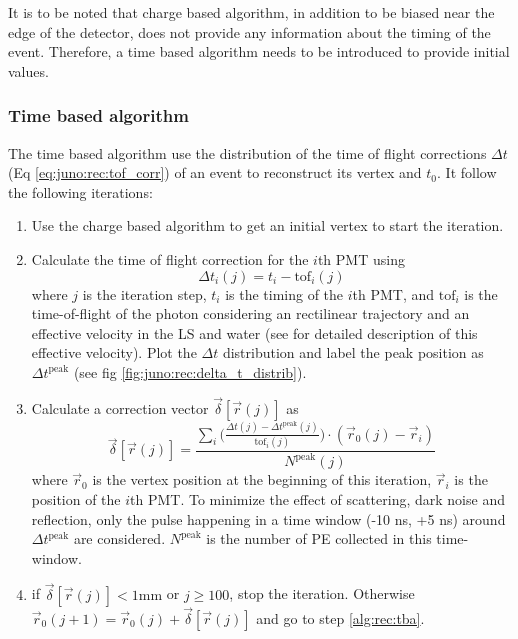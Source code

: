 \documentclass[../main.tex]{subfiles}
\begin{document}
It is to be noted that charge based algorithm, in addition to be biased near the edge of the detector, does not provide any information about the timing of the event. Therefore, a time based algorithm needs to be introduced to provide initial values.

\subsubsection{Time based algorithm}

The time based algorithm use the distribution of the time of flight corrections $\Delta t$ (Eq \ref{eq:juno:rec:tof_corr}) of an event to reconstruct its vertex and $t_0$. It follow the following iterations:

\begin{enumerate}
  \item Use the charge based algorithm to get an initial vertex to start the iteration.

  \item \label{alg:rec:tba} Calculate the time of flight correction for the $i$th PMT using \begin{equation}
      \label{eq:juno:rec:tof_corr}
      \Delta t_i (j) = t_i - \mathrm{tof}_i (j)
    \end{equation}
    where $j$ is the iteration step, $t_i$ is the timing of the $i$th PMT, and $\mathrm{tof}_i$ is the time-of-flight of the photon considering an rectilinear trajectory and an effective velocity in the LS and water (see \cite{li_event_2021} for detailed description of this effective velocity). Plot the $\Delta t$ distribution and label the peak position as $\Delta t^{\mathrm{peak}}$ (see fig \ref{fig:juno:rec:delta_t_distrib}).

  \item Calculate a correction vector $\vec{\delta} [\vec{r}(j)]$ as \begin{equation}
      \vec{\delta} [\vec{r}(j)] = \frac{\sum_i \bigg(\frac{\Delta t(j) - \Delta t^{\mathrm{peak}}(j)}{\mathrm{tof}_i(j)} \bigg) \cdot (\vec{r}_0(j) - \vec{r}_i)}{N^{\mathrm{peak}}(j)}
    \end{equation}
    where $\vec{r}_0$ is the vertex position at the beginning of this iteration, $\vec{r}_i$ is the position of the $i$th PMT. To minimize the effect of scattering, dark noise and reflection, only the pulse happening in a time window (-10 ns, +5 ns) around $\Delta t^{\mathrm{peak}}$ are considered. $N^{\mathrm{peak}}$ is the number of PE collected in this time-window.

  \item if $\vec{\delta} [\vec{r}(j)] < 1 \mathrm{mm}$ or $j \geq 100$, stop the iteration. Otherwise $\vec{r}_0 (j + 1) = \vec{r}_0 (j) + \vec{\delta} [\vec{r}(j)]$ and go to step \ref{alg:rec:tba}.
\end{enumerate}
\end{document}
